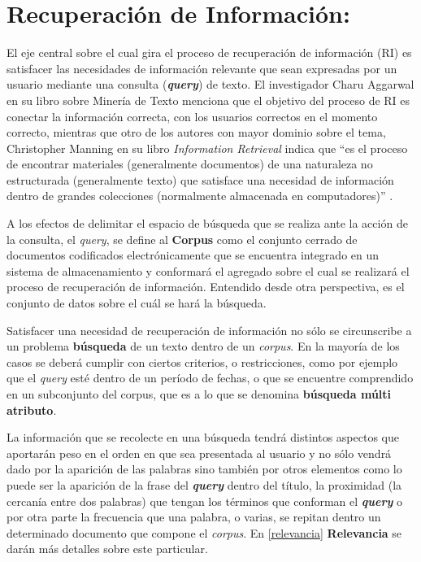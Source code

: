 \documentclass[
  10,
  openany]{book}
\begin{document}
\hypertarget{infret}{%
\section{Recuperación de Información:}\label{infret}}

El eje central sobre el cual gira el proceso de recuperación de información (RI) es satisfacer las necesidades de información relevante que sean expresadas por un usuario mediante una consulta (\textbf{\emph{query}}) de texto. El investigador Charu Aggarwal en su libro sobre Minería de Texto \citep{miningt2012} menciona que el objetivo del proceso de RI es conectar la información correcta, con los usuarios correctos en el momento correcto, mientras que otro de los autores con mayor dominio sobre el tema, Christopher Manning en su libro \emph{Information Retrieval} indica que ``es el proceso de encontrar materiales (generalmente documentos) de una naturaleza no estructurada (generalmente texto) que satisface una necesidad de información dentro de grandes colecciones (normalmente almacenada en computadores)'' \citep{manning2008}.

A los efectos de delimitar el espacio de búsqueda que se realiza ante la acción de la consulta, el \emph{query}, se define al \textbf{Corpus} como el conjunto cerrado de documentos codificados electrónicamente que se encuentra integrado en un sistema de almacenamiento y conformará el agregado \citep{martiaurora} sobre el cual se realizará el proceso de recuperación de información. Entendido desde otra perspectiva, es el conjunto de datos sobre el cuál se hará la búsqueda.

Satisfacer una necesidad de recuperación de información no sólo se circunscribe a un problema \textbf{búsqueda} de un texto dentro de un \emph{corpus}. En la mayoría de los casos se deberá cumplir con ciertos criterios, o restricciones, como por ejemplo que el \emph{query} esté dentro de un período de fechas, o que se encuentre comprendido en un subconjunto del corpus, que es a lo que se denomina \textbf{búsqueda múlti atributo}.

La información que se recolecte en una búsqueda tendrá distintos aspectos que aportarán peso en el orden en que sea presentada al usuario y no sólo vendrá dado por la aparición de las palabras sino también por otros elementos como lo puede ser la aparición de la frase del \textbf{\emph{query}} dentro del título, la proximidad (la cercanía entre dos palabras) que tengan los términos que conforman el \textbf{\emph{query}} o por otra parte la frecuencia que una palabra, o varias, se repitan dentro un determinado documento que compone el \emph{corpus}. En \ref{relevancia} \textbf{Relevancia} se darán más detalles sobre este particular.
\end{document}
